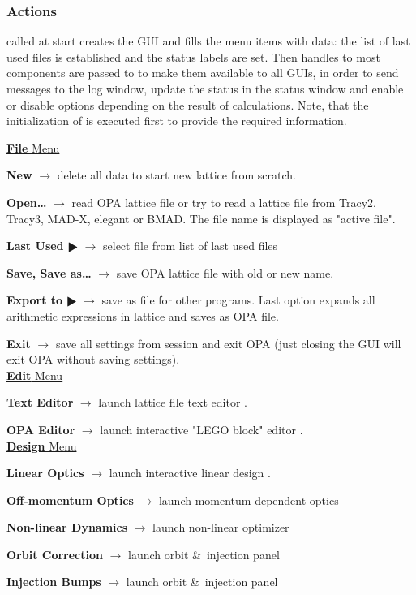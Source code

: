 \documentclass[12pt]{article}
\newcommand\code[1]{{\tt #1}}
\newcommand{\ofld}[1]{\colorbox{black!15}{{{\color{black}\bf #1}}}}
\newcommand\guico[1]{{\color{blue}\code{#1}}}
\newcommand{\evcod}[2]{\ofld{#1} $\rightarrow$ \guico{#2}}
\newcommand{\opagui}[1]{\colorbox{blue!20}{{\color{black}\code{#1}}}}
\newcommand{\ogui}[1]{\hyperref[#1]{\opagui{#1}}}
\newcommand{\opauni}[1]{\colorbox{orange!30}{{\color{black}\code{#1}}}}
\newcommand{\ouni}[1]{\hyperref[#1]{\opauni{#1}}}
\newcommand{\act}[1]{\subsubsection*{Actions} #1}
\begin{document}
\act{
\guico{FormCreate} called at start creates the GUI and fills the menu items with data: the list of last used files is established and the status labels are set. Then handles to most components are passed to \ouni{globlib} to make them available to all GUIs, in order to send messages to the log window, update the status in the status window and enable or disable options depending on the result of calculations.
Note, that the initialization of \ouni{globlib} is executed first to provide the required information. 

\underline{\ofld{File} Menu}

\evcod{New}{fi\_new} delete all data to start new lattice from scratch.

\evcod{Open\dots}{fi\_open} read OPA lattice file or try to read a lattice  file from Tracy2, Tracy3, MAD-X, elegant or BMAD. The file name is displayed as "active file".

\evcod{Last Used $\RHD$}{fi\_last} select file from list of last used files

\evcod{Save, Save as\dots}{fi\_[save,svas]} save OPA lattice file with old or new name.

\evcod{Export to $\RHD$}{ex\_[tracy2,tracy,madx,elegant,bmad,opanovar]} save as file for other programs. Last option expands all arithmetic expressions in lattice and saves as OPA file.

\evcod{Exit}{fi\_exit} save all settings from session and exit OPA (just closing the GUI will exit OPA without saving settings).\\

\underline{\ofld{Edit} Menu}


\evcod{Text Editor}{ed\_text} launch lattice file text editor \ogui{opatexteditor}.

\evcod{OPA Editor}{ed\_oped} launch interactive "LEGO block" editor \ogui{opaeditor}.\\

\underline{\ofld{Design} Menu}

\evcod{Linear Optics}{ds\_opti} launch interactive linear design \ogui{opalinop}.

\evcod{Off-momentum Optics}{ds\_dppo}  launch momentum dependent optics \ogui{opamomentum}

\evcod{Non-linear Dynamics}{ds\_sext} launch non-linear optimizer \ogui{opachroma}

\evcod{Orbit Correction}{ds\_orbc} launch orbit \&\ injection panel \ogui{opaorbit}

\evcod{Injection Bumps}{ds\_injc } launch orbit \&\ injection panel  \ogui{opaorbit}

}
\end{document}
